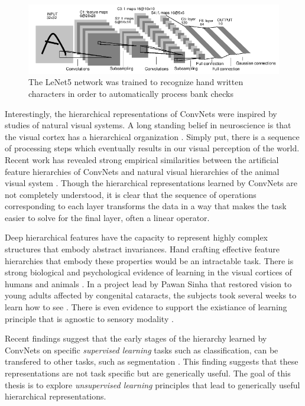 \begin{figure} 
\centering
\includegraphics[scale=0.5]{./figures/introduction/lenet5.png} 
\caption{The LeNet5 network was trained to recognize hand written characters in order to 
automatically process bank checks} 
\label{fig:LeNet5} 
\end{figure}  

Interestingly, the hierarchical representations of ConvNets were inspired by
studies of natural visual systems. A long standing belief in neuroscience is
that the visual cortex has a hierarchical organization
\cite{hubel1968,felleman1991}. Simply put, there is a sequence of processing
steps which eventually results in our visual perception of the world. Recent
work has revealed strong empirical similarities between the artificial feature
hierarchies of ConvNets and natural visual hierarchies of the animal visual
system \cite{yamins2014}. Though the hierarchical representations learned by
ConvNets are not completely understood, it is clear that the sequence of
operations corresponding to each layer transforms the data in a way that makes
the task easier to solve for the final layer, often a linear operator.    

Deep hierarchical features have the capacity to represent highly complex
structures that embody abstract invariances. Hand crafting effective feature
hierarchies that embody these properties would be an intractable task. There is
strong biological and psychological evidence of learning in the visual
cortices of humans and animals \cite{foldiak1991,sinha2013}. In a project lead by    
Pawan Sinha that restored vision to young adults affected by congenital cataracts, 
the subjects took several weeks to learn how to see \cite{sinha2013}. There is even
evidence to support the existiance of learning principle that is agnostic to
sensory modality \cite{sharma2000}.   

Recent findings suggest that the early stages of the hierarchy learned by ConvNets 
on specific \emph{supervised learning} tasks such as classification, can be transfered 
to other tasks, such as segmentation \cite{yosinski2014}. This finding suggests 
that these representations are not task specific but are generically useful. 
The goal of this thesis is to explore \emph{unsupervised learning} principles that lead
to generically useful hierarchical representations.    

